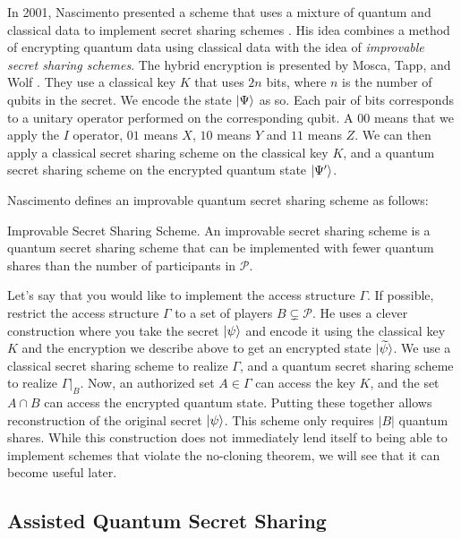 In 2001, Nascimento presented a scheme that uses a mixture of quantum and classical data to implement secret sharing schemes \cite{nascimento_improving_2001}. His idea combines a method of encrypting quantum data using classical data with the idea of \textit{improvable secret sharing schemes}. The hybrid encryption is presented by Mosca, Tapp, and Wolf \cite{mosca2000private}. They use a classical key $K$ that uses $2n$ bits, where $n$ is the number of qubits in the secret. We encode the state $\ket{\Psi}$ as so. Each pair of bits corresponds to a unitary operator performed on the corresponding qubit. A $00$ means that we apply the $I$ operator, $01$ means $X$, $10$ means $Y$ and $11$ means $Z$. We can then apply a classical secret sharing scheme on the classical key $K$, and a quantum secret sharing scheme on the encrypted quantum state $\ket{\Psi'}$.

Nascimento defines an improvable quantum secret sharing scheme as follows:

\begin{definition}{Improvable Secret Sharing Scheme.}
    \label{defn:improvable}
    An improvable secret sharing scheme is a quantum secret sharing scheme that can be implemented with fewer quantum shares than the number of participants in $\mathcal{P}$.
\end{definition}

Let's say that you would like to implement the access structure $\Gamma$. If possible, restrict the access structure $\Gamma$ to a set of players $B \subsetneq \mathcal{P}$. He uses a clever construction where you take the secret $\ket{\psi}$ and encode it using the classical key $K$ and the encryption we describe above to get an encrypted state $\ket{\widetilde{\psi}}$. We use a classical secret sharing scheme to realize $\Gamma$, and a quantum secret sharing scheme to realize $\Gamma |_B$. Now, an authorized set $A \in \Gamma$ can access the key $K$, and the set $A \cap B$ can access the encrypted quantum state. Putting these together allows reconstruction of the original secret $\ket{\psi}$. This scheme only requires $|B|$ quantum shares. While this construction does not immediately lend itself to being able to implement schemes that violate the no-cloning theorem, we will see that it can become useful later.

\subsection{Assisted Quantum Secret Sharing}
\label{ssec:aqss}

